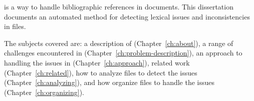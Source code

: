 {\bibtex} is a way to handle bibliographic references in
documents. This dissertation documents an automated method for
detecting lexical issues and inconsistencies in {\bibtex} files.

The subjects covered are: a description of {\bibtex}
(Chapter~\ref{ch:about}), a range of challenges encountered in
{\bibtex} (Chapter~\ref{ch:problem-description}), an approach to
handling the issues in {\bibtex} (Chapter~\ref{ch:approach}), related
work (Chapter~\ref{ch:related}), how to analyze {\bibtex} files  to
detect the issues (Chapter~\ref{ch:analyzing}), and how organize
{\bibtex} files to handle the issues (Chapter~\ref{ch:organizing}).
